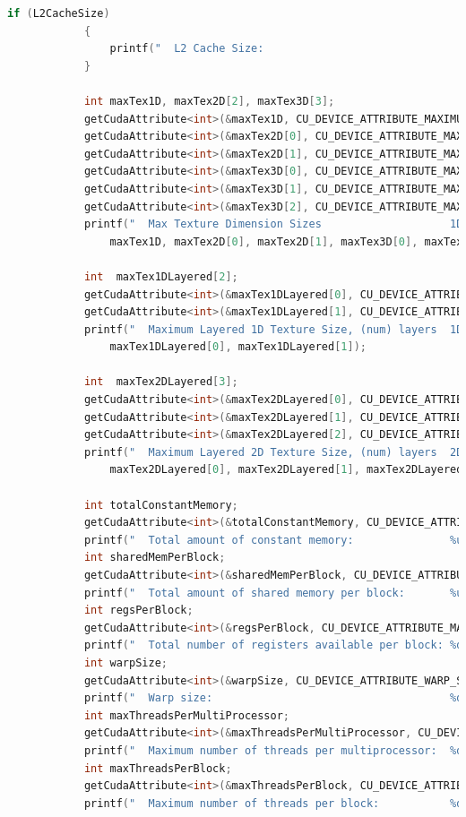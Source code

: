 \documentclass{scrreprt}
\begin{document}
\begin{lstlisting}[language=C++, caption=deviceQueryDrv.h]
			if (L2CacheSize)
			{
				printf("  L2 Cache Size:                                 %d bytes\n", L2CacheSize);
			}

			int maxTex1D, maxTex2D[2], maxTex3D[3];
			getCudaAttribute<int>(&maxTex1D, CU_DEVICE_ATTRIBUTE_MAXIMUM_TEXTURE1D_WIDTH, dev);
			getCudaAttribute<int>(&maxTex2D[0], CU_DEVICE_ATTRIBUTE_MAXIMUM_TEXTURE2D_WIDTH, dev);
			getCudaAttribute<int>(&maxTex2D[1], CU_DEVICE_ATTRIBUTE_MAXIMUM_TEXTURE2D_HEIGHT, dev);
			getCudaAttribute<int>(&maxTex3D[0], CU_DEVICE_ATTRIBUTE_MAXIMUM_TEXTURE3D_WIDTH, dev);
			getCudaAttribute<int>(&maxTex3D[1], CU_DEVICE_ATTRIBUTE_MAXIMUM_TEXTURE3D_HEIGHT, dev);
			getCudaAttribute<int>(&maxTex3D[2], CU_DEVICE_ATTRIBUTE_MAXIMUM_TEXTURE3D_DEPTH, dev);
			printf("  Max Texture Dimension Sizes                    1D=(%d) 2D=(%d, %d) 3D=(%d, %d, %d)\n",
				maxTex1D, maxTex2D[0], maxTex2D[1], maxTex3D[0], maxTex3D[1], maxTex3D[2]);

			int  maxTex1DLayered[2];
			getCudaAttribute<int>(&maxTex1DLayered[0], CU_DEVICE_ATTRIBUTE_MAXIMUM_TEXTURE1D_LAYERED_WIDTH, dev);
			getCudaAttribute<int>(&maxTex1DLayered[1], CU_DEVICE_ATTRIBUTE_MAXIMUM_TEXTURE1D_LAYERED_LAYERS, dev);
			printf("  Maximum Layered 1D Texture Size, (num) layers  1D=(%d), %d layers\n",
				maxTex1DLayered[0], maxTex1DLayered[1]);

			int  maxTex2DLayered[3];
			getCudaAttribute<int>(&maxTex2DLayered[0], CU_DEVICE_ATTRIBUTE_MAXIMUM_TEXTURE2D_LAYERED_WIDTH, dev);
			getCudaAttribute<int>(&maxTex2DLayered[1], CU_DEVICE_ATTRIBUTE_MAXIMUM_TEXTURE2D_LAYERED_HEIGHT, dev);
			getCudaAttribute<int>(&maxTex2DLayered[2], CU_DEVICE_ATTRIBUTE_MAXIMUM_TEXTURE2D_LAYERED_LAYERS, dev);
			printf("  Maximum Layered 2D Texture Size, (num) layers  2D=(%d, %d), %d layers\n",
				maxTex2DLayered[0], maxTex2DLayered[1], maxTex2DLayered[2]);

			int totalConstantMemory;
			getCudaAttribute<int>(&totalConstantMemory, CU_DEVICE_ATTRIBUTE_TOTAL_CONSTANT_MEMORY, dev);
			printf("  Total amount of constant memory:               %u bytes\n", totalConstantMemory);
			int sharedMemPerBlock;
			getCudaAttribute<int>(&sharedMemPerBlock, CU_DEVICE_ATTRIBUTE_MAX_SHARED_MEMORY_PER_BLOCK, dev);
			printf("  Total amount of shared memory per block:       %u bytes\n", sharedMemPerBlock);
			int regsPerBlock;
			getCudaAttribute<int>(&regsPerBlock, CU_DEVICE_ATTRIBUTE_MAX_REGISTERS_PER_BLOCK, dev);
			printf("  Total number of registers available per block: %d\n", regsPerBlock);
			int warpSize;
			getCudaAttribute<int>(&warpSize, CU_DEVICE_ATTRIBUTE_WARP_SIZE, dev);
			printf("  Warp size:                                     %d\n", warpSize);
			int maxThreadsPerMultiProcessor;
			getCudaAttribute<int>(&maxThreadsPerMultiProcessor, CU_DEVICE_ATTRIBUTE_MAX_THREADS_PER_MULTIPROCESSOR, dev);
			printf("  Maximum number of threads per multiprocessor:  %d\n", maxThreadsPerMultiProcessor);
			int maxThreadsPerBlock;
			getCudaAttribute<int>(&maxThreadsPerBlock, CU_DEVICE_ATTRIBUTE_MAX_THREADS_PER_BLOCK, dev);
			printf("  Maximum number of threads per block:           %d\n", maxThreadsPerBlock);


\end{lstlisting}
\end{document}
